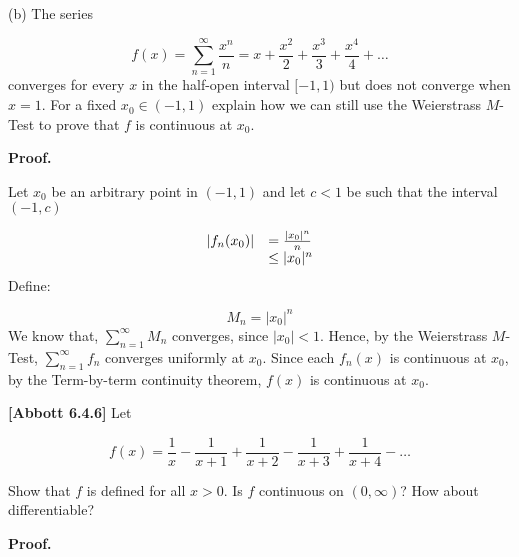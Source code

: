 \documentclass[10pt]{article}
\begin{document}
(b) The series 


\begin{equation*}
f( x) =\sum _{n=1}^{\infty }\frac{x^{n}}{n} =x+\frac{x^{2}}{2} +\frac{x^{3}}{3} +\frac{x^{4}}{4} +\dotsc 
\end{equation*}
converges for every $\displaystyle x$ in the half-open interval $\displaystyle [ -1,1)$ but does not converge when $\displaystyle x=1$. For a fixed $\displaystyle x_{0} \in ( -1,1)$ explain how we can still use the Weierstrass $\displaystyle M$-Test to prove that $\displaystyle f$ is continuous at $\displaystyle x_{0}$.



\textbf{Proof.}



Let $\displaystyle x_{0}$ be an arbitrary point in $\displaystyle ( -1,1)$ and let $\displaystyle c< 1$ be such that the interval $\displaystyle ( -1,c)$


\begin{equation*}
\begin{array}{ c l }
|f_{n}( x_{0}) | & =\frac{|x_{0} |^{n}}{n}\\
 & \leq |x_{0} |^{n}
\end{array}
\end{equation*}
Define:


\begin{equation*}
M_{n} =|x_{0} |^{n}
\end{equation*}
We know that, $\displaystyle \sum _{n=1}^{\infty } M_{n}$ converges, since $\displaystyle |x_{0} |< 1$. Hence, by the Weierstrass $\displaystyle M$-Test, $\displaystyle \sum _{n=1}^{\infty } f_{n}$ converges uniformly at $\displaystyle x_{0}$. Since each $\displaystyle f_{n}( x)$ is continuous at $\displaystyle x_{0}$, by the Term-by-term continuity theorem, $\displaystyle f( x)$ is continuous at $\displaystyle x_{0}$.



\textbf{[Abbott 6.4.6]} Let


\begin{equation*}
f( x) =\frac{1}{x} -\frac{1}{x+1} +\frac{1}{x+2} -\frac{1}{x+3} +\frac{1}{x+4} -\dotsc 
\end{equation*}


Show that $\displaystyle f$ is defined for all $\displaystyle x >0$. Is $\displaystyle f$ continuous on $\displaystyle ( 0,\infty )$? How about differentiable?



\textbf{Proof.}
\end{document}
